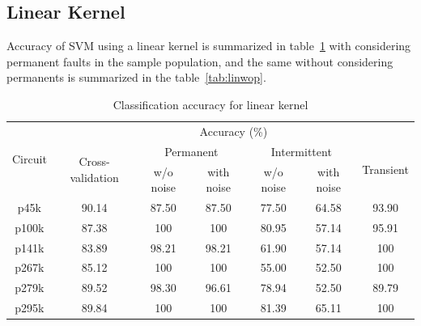 \subsection{Linear Kernel}
Accuracy of SVM using a linear kernel is summarized in table~\ref{tab:linwp} with considering permanent faults in the sample population, and the same without considering permanents is summarized in the table~\ref{tab:linwop}.
\begin{table}[h]

	\captionsetup{justification=centering}
\begin{tabular}{ccccccc}
\hline
\multicolumn{1}{c}{\multirow{3}{*}{Circuit}} & \multicolumn{6}{c}{Accuracy (\%)}\\ \cline{2-7} 
\multicolumn{1}{c}{}                         & \multicolumn{1}{c}{\multirow{2}{*}{Cross-validation}} & \multicolumn{2}{c}{Permanent} & \multicolumn{2}{c}{Intermittent} & \multicolumn{1}{c}{\multirow{2}{*}{Transient}} \\ \cline{3-6}
                                             &                                                       & w/o noise     & with noise    & w/o noise      & with noise      &                                                \\ \hline
p45k                                         & 90.14                                                 & 87.50         & 87.50         & 77.50          & 64.58           & 93.90                                          \\
p100k                                        & 87.38                                                 & 100           & 100           & 80.95          & 57.14           & 95.91                                          \\
p141k                                        & 83.89                                                 & 98.21         & 98.21         & 61.90          & 57.14           & 100                                            \\
p267k                                        & 85.12                                                 & 100           & 100           & 55.00          & 52.50           & 100                                            \\
p279k                                        & 89.52                                                 & 98.30         & 96.61         & 78.94          & 52.50           & 89.79                                          \\
p295k                                        & 89.84                                                 & 100           & 100           & 81.39          & 65.11           & 100   \\
\hline                                        
\end{tabular}
\caption {Classification accuracy for linear kernel}
\label{tab:linwp}
\end{table}

